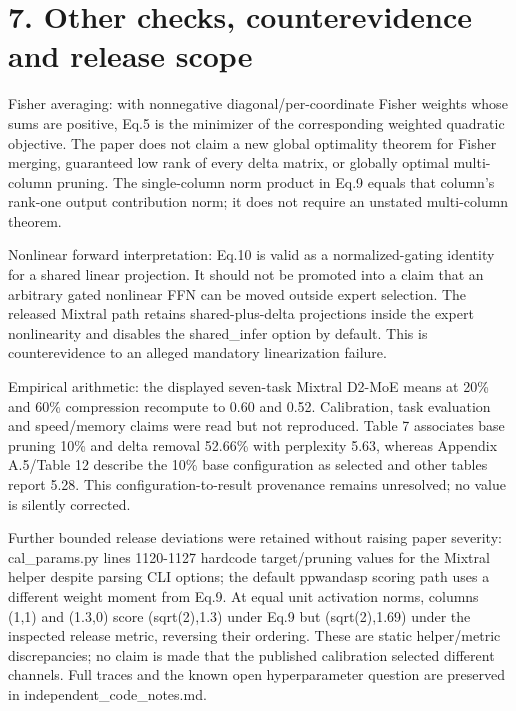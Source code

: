\documentclass[10pt]{article}
\begin{document}
\section*{7. Other checks, counterevidence and release scope}
Fisher averaging: with nonnegative diagonal/per-coordinate Fisher weights whose sums are positive, Eq.5 is the minimizer of the corresponding weighted quadratic objective. The paper does not claim a new global optimality theorem for Fisher merging, guaranteed low rank of every delta matrix, or globally optimal multi-column pruning. The single-column norm product in Eq.9 equals that column’s rank-one output contribution norm; it does not require an unstated multi-column theorem.\par
Nonlinear forward interpretation: Eq.10 is valid as a normalized-gating identity for a shared linear projection. It should not be promoted into a claim that an arbitrary gated nonlinear FFN can be moved outside expert selection. The released Mixtral path retains shared-plus-delta projections inside the expert nonlinearity and disables the shared\_infer option by default. This is counterevidence to an alleged mandatory linearization failure.\par
Empirical arithmetic: the displayed seven-task Mixtral D2-MoE means at 20\% and 60\% compression recompute to 0.60 and 0.52. Calibration, task evaluation and speed/memory claims were read but not reproduced. Table 7 associates base pruning 10\% and delta removal 52.66\% with perplexity 5.63, whereas Appendix A.5/Table 12 describe the 10\% base configuration as selected and other tables report 5.28. This configuration-to-result provenance remains unresolved; no value is silently corrected.\par
Further bounded release deviations were retained without raising paper severity: cal\_params.py lines 1120-1127 hardcode target/pruning values for the Mixtral helper despite parsing CLI options; the default ppwandasp scoring path uses a different weight moment from Eq.9. At equal unit activation norms, columns (1,1) and (1.3,0) score (sqrt(2),1.3) under Eq.9 but (sqrt(2),1.69) under the inspected release metric, reversing their ordering. These are static helper/metric discrepancies; no claim is made that the published calibration selected different channels. Full traces and the known open hyperparameter question are preserved in independent\_code\_notes.md.\par
\end{document}
